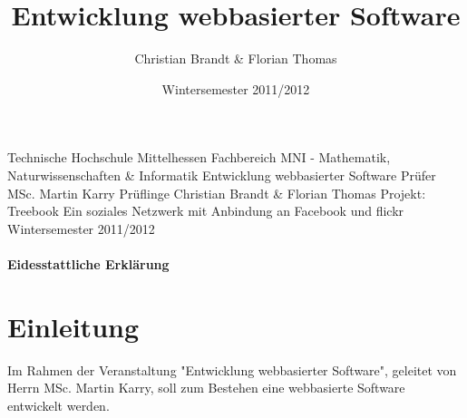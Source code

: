 \documentclass[10pt,a4paper]{book}
\author{Christian Brandt & Florian Thomas}
\title{Entwicklung webbasierter Software}
\date{Wintersemester 2011/2012}
\begin{document}
\begin{titlepage}
\begin{center}
\LARGE{Technische Hochschule Mittelhessen}
\linebreak
\large{Fachbereich MNI - Mathematik, Naturwissenschaften \& Informatik}
\linebreak 
\linebreak
\linebreak
\linebreak
\linebreak
\linebreak
\linebreak
\LARGE{Entwicklung webbasierter Software}
\linebreak
\linebreak
\linebreak
\linebreak
\linebreak
\linebreak
\linebreak
\large{Prüfer}
\linebreak
\large{MSc. Martin Karry}
\linebreak
\linebreak
\large{Prüflinge}
\linebreak
\large{Christian Brandt \& Florian Thomas}
\linebreak
\linebreak
\linebreak
\linebreak
\Large{Projekt: Treebook}
\linebreak
\normalsize{Ein soziales Netzwerk mit Anbindung an Facebook und flickr}
\linebreak
\linebreak
\linebreak
\linebreak
\linebreak
\linebreak
\normalsize{Wintersemester 2011/2012}
\end{center}
\end{titlepage}
\setcounter{page}{1}
\subsubsection{Eidesstattliche Erklärung}

\tableofcontents
\chapter{Einleitung}
Im Rahmen der Veranstaltung "Entwicklung webbasierter Software", geleitet von Herrn MSc. Martin Karry, soll zum Bestehen eine webbasierte Software entwickelt werden.
\end{document}
